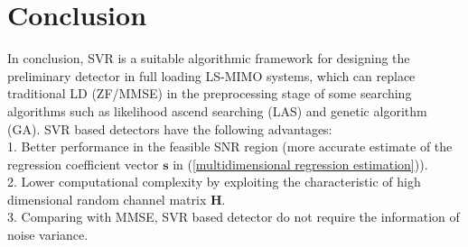 \documentclass[10pt, draftclsnofoot, onecolumn]{IEEEtran}
\begin{document}




\section{Conclusion}
In conclusion, SVR is a suitable algorithmic framework for designing the preliminary detector in full loading LS-MIMO systems, which can replace traditional LD (ZF/MMSE) in the preprocessing stage of some searching algorithms such as likelihood ascend searching (LAS)\cite{vardhan2008low}\cite{li2010multiple} and genetic algorithm (GA)\cite{juntti1997genetic}\cite{ergun2000multiuser}. SVR based detectors have the following advantages:\\
1. Better performance in the feasible SNR region (more accurate estimate of the regression coefficient vector $\mathbf{s}$ in (\ref{multidimensional regression estimation})).\\
2. Lower computational complexity by exploiting the characteristic of high dimensional random channel matrix $\mathbf{H}$.\\ 
3. Comparing with MMSE, SVR based detector do not require the information of noise variance.





%
\end{document}
